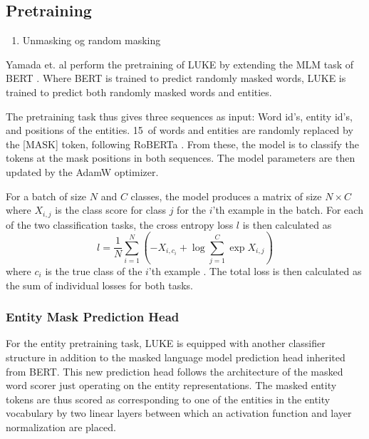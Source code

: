 \documentclass[main.tex]{subfiles}
\begin{document}
\subsection{Pretraining}
\begin{enumerate}
    \item Unmasking og random masking
\end{enumerate}

Yamada et. al perform the pretraining of LUKE by extending the MLM task of BERT \cite{devlin2019bert}.
Where BERT is trained to predict randomly masked words, LUKE is trained to predict both randomly masked words and entities.

The pretraining task thus gives three sequences as input:
Word id's, entity id's, and positions of the entities.
15\pro\ of words and entities are randomly replaced by the [MASK] token, following RoBERTa \cite{liu2019roberta}.
From these, the model is to classify the tokens at the mask positions in both sequences.
The model parameters are then updated by the AdamW optimizer.

For a batch of size $ N $ and $ C $ classes, the model produces a matrix of size $ N\times C $ where $ X_{i, j} $ is the class score for class $ j $ for the $ i $'th example in the batch.
For each of the two classification tasks, the cross entropy loss $ l $ is then calculated as
\begin{equation}\label{eq:crossentropyloss}
    l = \frac{1}{N} \sum_{i=1}^N \left(
        -X_{i, c_i} + \log \sum_{j=1}^C \exp X_{i, j}
    \right)
\end{equation}
where $ c_i $ is the true class of the $ i $'th example \cite{pytorchcel}.
The total loss is then calculated as the sum of individual losses for both tasks.

\subsubsection{Entity Mask Prediction Head}
For the entity pretraining task, LUKE is equipped with another classifier structure in addition to the masked language model prediction head inherited from BERT.
This new prediction head follows the architecture of the masked word scorer just operating on the entity representations.
The masked entity tokens are thus scored as corresponding to one of the entities in the entity vocabulary by two linear layers between which an activation function and layer normalization are placed.
\end{document}
